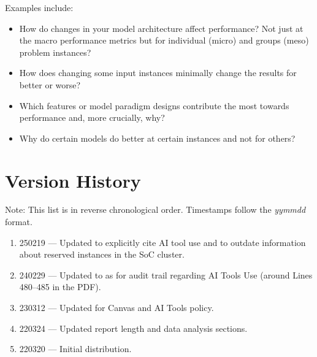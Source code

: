 \documentclass[11pt]{article}
\begin{document}
\begin{enumerate}
    Examples include:
    \begin{itemize}
        \item How do changes in your model architecture affect performance?  Not just at the macro performance metrics but for individual (micro) and groups (meso) problem instances?
        \item How does changing some input instances minimally change the results for better or worse?
        \item Which features or model paradigm designs contribute the most towards performance and, more crucially, why?
        \item Why do certain models do better at certain instances and not for others?
    \end{itemize}
    
\end{enumerate}

\section{Version History}

Note: This list is in reverse chronological order.  Timestamps follow the {\it yymmdd} format.
\begin{enumerate}
    \item 250219 --- Updated to explicitly cite AI tool use and to outdate information about reserved instances in the SoC cluster.
    \item 240229 --- Updated to as for audit trail regarding AI Tools Use (around Lines 480--485 in the PDF). 
    \item 230312 --- Updated for Canvas and AI Tools policy.
    \item 220324 --- Updated report length and data analysis sections.
    \item 220320 --- Initial distribution.
\end{enumerate}
\end{document}
